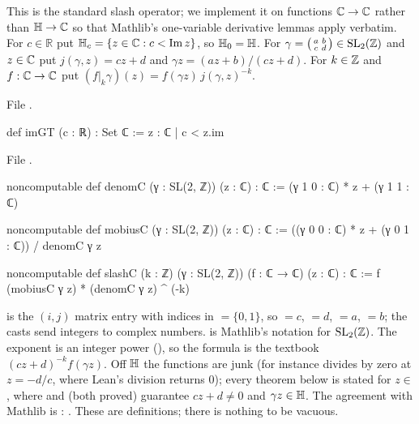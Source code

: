 \begin{definition}\label{l14:def:slashC}
This is the standard slash operator; we implement it on functions ${\mathbb{C}}\to{\mathbb{C}}$ rather than $\mathbb{H}\to{\mathbb{C}}$ so that Mathlib's
one-variable derivative lemmas apply verbatim. For $c\in\mathbb R$ put $\mathbb{H}_c = \{z\in{\mathbb{C}} : c<\operatorname{Im} z\}$, so
$\mathbb{H}_0 = \mathbb{H}$. For
$\gamma = \left(\begin{smallmatrix}a&b\\c&d\end{smallmatrix}\right)\in\mathrm{SL}_2(\mathbb{Z})$ and $z\in{\mathbb{C}}$ put
$j(\gamma,z) = cz+d$ and $\gamma z = (az+b)/(cz+d)$. For $k\in{\mathbb{Z}}$ and $f:{\mathbb{C}}\to{\mathbb{C}}$ put
$(f|_k\gamma)(z) = f(\gamma z)\,j(\gamma,z)^{-k}$.
\end{definition}
\noindent File .
\begin{leancode}
def imGT (c : ℝ) : Set ℂ := {z : ℂ | c < z.im}
\end{leancode}
\noindent File .
\begin{leancode}
noncomputable def denomC (γ : SL(2, ℤ)) (z : ℂ) : ℂ := (γ 1 0 : ℂ) * z + (γ 1 1 : ℂ)

noncomputable def mobiusC (γ : SL(2, ℤ)) (z : ℂ) : ℂ :=
  ((γ 0 0 : ℂ) * z + (γ 0 1 : ℂ)) / denomC γ z

noncomputable def slashC (k : ℤ) (γ : SL(2, ℤ)) (f : ℂ → ℂ) (z : ℂ) : ℂ :=
  f (mobiusC γ z) * (denomC γ z) ^ (-k)
\end{leancode}
\begin{dictionary}
 is the $(i,j)$ matrix entry with indices in  $=\{0,1\}$, so  $=c$,  $=d$,
 $=a$,  $=b$; the casts  send integers to complex numbers.  is
Mathlib's notation for $\mathrm{SL}_2(\mathbb{Z})$. The exponent  is an integer power (), so the formula is the
textbook $(cz+d)^{-k}f(\gamma z)$. Off $\mathbb{H}$ the functions are junk (for instance  divides by zero at
$z=-d/c$, where Lean's division returns $0$); every theorem below is stated for $z\in$ , where
 and  (both proved) guarantee $cz+d\neq0$ and $\gamma z\in\mathbb{H}$. The
agreement with Mathlib is : . These are
definitions; there is nothing to be vacuous.
\end{dictionary}
